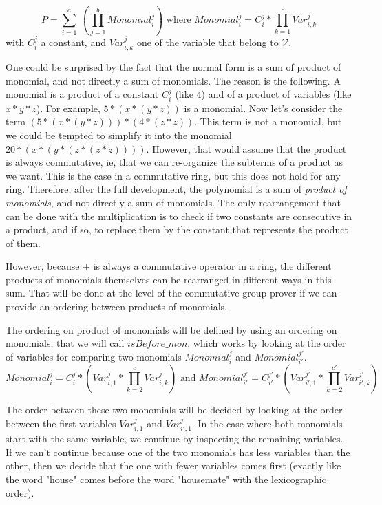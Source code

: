 \[
P = \sum_{i=1}^{a}\ (\prod_{j=1}^{b} Monomial_{i}^j)
\text{ where } 
Monomial_{i}^j = C_{i}^j * \prod_{k=1}^{c} Var_{i,k}^{j}
\]
with $C_{i}^j$ a constant, and $Var_{i,k}^{j}$ one of the variable that belong to $\mathcal{V}$.

One could be surprised by the fact that the normal form is a sum of product of monomial, and not directly a sum of monomials. The reason is the following. A monomial is a product of a constant $C_{i}^j$ (like $4$) and of a product of variables (like $x*y*z$). For example,  $5*(x*(y*z))$ is a monomial. Now let's consider the term $(5*(x*(y*z))) * (4*(z*z))$. This term is not a monomial, but we could be tempted to simplify it into the monomial $20*(x*(y*(z*(z*z))))$. However, that would assume that the product is always commutative, ie, that we can re-organize the subterms of a product as we want. This is the case in a commutative ring, but this does not hold for any ring. Therefore, after the full development, the polynomial is a sum of \emph{product of monomials}, and not directly a sum of monomials. The only rearrangement that can be done with the multiplication is to check if two constants are consecutive in a product, and if so, to replace them by the constant that represents the product of them.

However, because $+$ is always a commutative operator in a ring, the different products of monomials themselves can be rearranged in different ways in this sum. That will be done at the level of the commutative group prover if we can provide an ordering between products of monomials.

The ordering on product of monomials will be defined by using an ordering on monomials, that we will call $isBefore\_mon$, which works by looking at the order of variables for comparing two monomials $Monomial_{i}^{j}$ and $Monomial_{i'}^{j'}$.
\[
Monomial_{i}^{j} = C_{i}^{j} * (Var_{i,1}^{j} * \prod_{k=2}^{c} Var_{i,k}^{j})
\text{ and }
Monomial_{i'}^{j'} = C_{i'}^{j'} * (Var_{i',1}^{j'} * \prod_{k=2}^{c'} Var_{i',k}^{j'})
\]

The order between these two monomials will be decided by looking at the order between the first variables $Var_{i,1}^{j}$ and $Var_{i',1}^{j'}$. In the case where both monomials start with the same variable, we continue by inspecting the remaining variables. If we can't continue because one of the two monomials has less variables than the other, then we decide that the one with fewer variables comes first (exactly like the word "house" comes before the word "housemate" with the lexicographic order).

